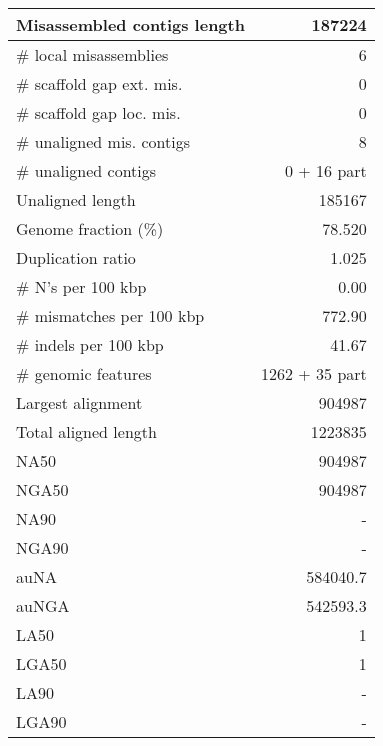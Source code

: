 \documentclass[12pt,a4paper]{article}
\begin{document}
\begin{table}[ht]
\begin{center}
\begin{tabular}{|l*{1}{|r}|}
Misassembled contigs length & 187224 \\ \hline
\# local misassemblies & 6 \\ \hline
\# scaffold gap ext. mis. & 0 \\ \hline
\# scaffold gap loc. mis. & 0 \\ \hline
\# unaligned mis. contigs & 8 \\ \hline
\# unaligned contigs & 0 + 16 part \\ \hline
Unaligned length & 185167 \\ \hline
Genome fraction (\%) & 78.520 \\ \hline
Duplication ratio & 1.025 \\ \hline
\# N's per 100 kbp & 0.00 \\ \hline
\# mismatches per 100 kbp & 772.90 \\ \hline
\# indels per 100 kbp & 41.67 \\ \hline
\# genomic features & 1262 + 35 part \\ \hline
Largest alignment & 904987 \\ \hline
Total aligned length & 1223835 \\ \hline
NA50 & 904987 \\ \hline
NGA50 & 904987 \\ \hline
NA90 & - \\ \hline
NGA90 & - \\ \hline
auNA & 584040.7 \\ \hline
auNGA & 542593.3 \\ \hline
LA50 & 1 \\ \hline
LGA50 & 1 \\ \hline
LA90 & - \\ \hline
LGA90 & - \\ \hline
\end{tabular}
\end{center}
\end{table}
\end{document}
